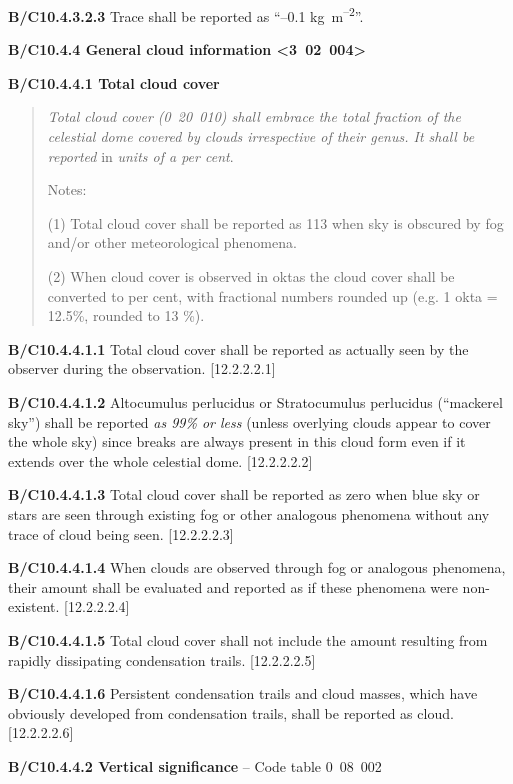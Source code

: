 \textbf{B/C10.4.3.2.3} Trace shall be reported as ``--0.1 kg~m\textsuperscript{--2}''.

\textbf{B/C10.4.4 General cloud information \textless3~02~004\textgreater{}}

\textbf{B/C10.4.4.1 Total cloud cover}

\begin{quote}
\emph{Total cloud cover (0~20~010) shall embrace the total fraction of the celestial dome covered by clouds irrespective of their genus. It shall be reported} in \emph{units of a per cent}.

Notes:

(1) Total cloud cover shall be reported as 113 when sky is obscured by fog and/or other meteorological phenomena.

(2) When cloud cover is observed in oktas the cloud cover shall be converted to per cent, with fractional numbers rounded up (e.g. 1 okta = 12.5\%, rounded to 13 \%).
\end{quote}

\textbf{B/C10.4.4.1.1} Total cloud cover shall be reported as actually seen by the observer during the observation. {[}12.2.2.2.1{]}

\textbf{B/C10.4.4.1.2} Altocumulus perlucidus or Stratocumulus perlucidus (``mackerel sky'') shall be reported \emph{as 99\% or less} (unless overlying clouds appear to cover the whole sky) since breaks are always present in this cloud form even if it extends over the whole celestial dome. {[}12.2.2.2.2{]}

\textbf{B/C10.4.4.1.3} Total cloud cover shall be reported as zero when blue sky or stars are seen through existing fog or other analogous phenomena without any trace of cloud being seen. {[}12.2.2.2.3{]}

\textbf{B/C10.4.4.1.4} When clouds are observed through fog or analogous phenomena, their amount shall be evaluated and reported as if these phenomena were non-existent. {[}12.2.2.2.4{]}

\textbf{B/C10.4.4.1.5} Total cloud cover shall not include the amount resulting from rapidly dissipating condensation trails. {[}12.2.2.2.5{]}

\textbf{B/C10.4.4.1.6} Persistent condensation trails and cloud masses, which have obviously developed from condensation trails, shall be reported as cloud. {[}12.2.2.2.6{]}

\textbf{B/C10.4.4.2 Vertical significance} -- Code table 0~08~002

